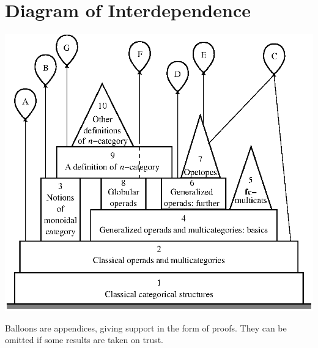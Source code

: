 
\chapter{Diagram of Interdependence}

\begin{center}
\includegraphics{inter.eps}
\end{center}

\vspace*{3ex}
\noindent
Balloons are appendices, giving support in the form of proofs.  They can be
omitted if some results are taken on trust.


